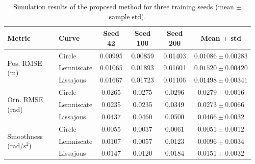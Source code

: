 \documentclass[preprint,12pt]{elsarticle}
\begin{document}
\begin{table}[!htbp]
\centering
\caption{\textcolor{black}{Simulation results of the proposed method for three training seeds (mean $\pm$ sample std).}}
\label{tab:seed_results}
\footnotesize
\color{black}
\renewcommand{\arraystretch}{1.0}
\setlength{\tabcolsep}{3pt}
\begin{tabular}{llcccc}
\toprule
\textbf{Metric} & \textbf{Curve} & \textbf{Seed 42} & \textbf{Seed 100} & \textbf{Seed 200} & \textbf{Mean $\pm$ std} \\
\midrule
\multirow{3}{*}{Pos. RMSE (m)} & Circle     & 0.00995 & 0.00859 & 0.01403 & $0.01086\pm0.00283$ \\
                               & Lemniscate & 0.01065 & 0.01893 & 0.01601 & $0.01520\pm0.00420$ \\
                               & Lissajous  & 0.01667 & 0.01723 & 0.01106 & $0.01498\pm0.00341$ \\
\midrule
\multirow{3}{*}{Orn. RMSE (rad)} & Circle     & 0.0265 & 0.0275 & 0.0296 & $0.0279\pm0.0016$ \\
                                 & Lemniscate & 0.0235 & 0.0235 & 0.0349 & $0.0273\pm0.0066$ \\
                                 & Lissajous  & 0.0437 & 0.0460 & 0.0500 & $0.0466\pm0.0032$ \\
\midrule
\multirow{3}{*}{Smoothness (rad/s$^2$)} & Circle     & 0.0055 & 0.0037 & 0.0061 & $0.0051\pm0.0012$ \\
                                        & Lemniscate & 0.0107 & 0.0057 & 0.0123 & $0.0096\pm0.0034$ \\
                                        & Lissajous  & 0.0147 & 0.0120 & 0.0184 & $0.0151\pm0.0032$ \\
\bottomrule
\end{tabular}
\end{table}
\end{document}
